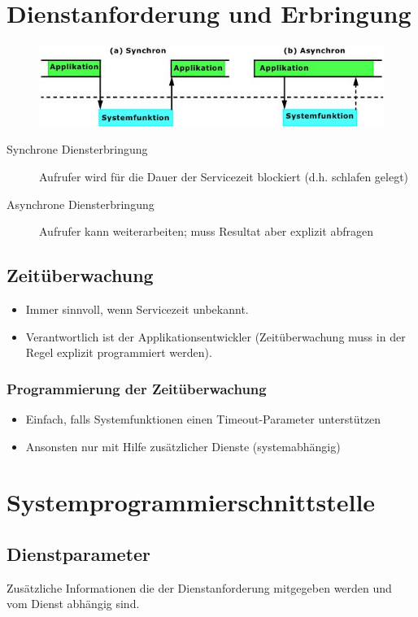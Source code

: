 \documentclass[ngerman,a4paper,12pt]{scrreprt}
\begin{document}
\section{Dienstanforderung und Erbringung}
\begin{figure}[htp]
	\centering
	\includegraphics[scale=1.00]{img/w4.2.jpg}
	\caption{}
	\label{}
\end{figure}
\begin{description}
	\item[Synchrone Diensterbringung]
Aufrufer wird für die Dauer der Servicezeit blockiert (d.h. schlafen gelegt)
	\item[Asynchrone Diensterbringung]
Aufrufer kann weiterarbeiten; muss Resultat aber explizit abfragen
\end{description}

\subsection{Zeitüberwachung}
\begin{itemize}
	\item Immer sinnvoll, wenn Servicezeit unbekannt.
	\item Verantwortlich ist der Applikationsentwickler (Zeitüberwachung muss in der Regel explizit programmiert werden).
\end{itemize}

\subsubsection{Programmierung der Zeitüberwachung}
\begin{itemize}
	\item Einfach, falls Systemfunktionen einen Timeout-Parameter unterstützen
	\item Ansonsten nur mit Hilfe zusätzlicher Dienste (systemabhängig)
\end{itemize}

\section{Systemprogrammierschnittstelle}
\subsection{Dienstparameter}
Zusätzliche Informationen die der Dienstanforderung mitgegeben werden und vom Dienst abhängig sind.
\end{document}
